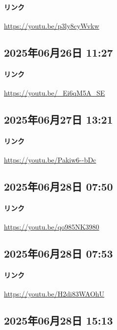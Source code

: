 \paragraph{リンク}
\url{https://youtu.be/p3ly8cyWvkw}

\subsection*{2025年06月26日 11:27}

\paragraph{リンク}
\url{https://youtu.be/_Ei6qM5A_SE}

\subsection*{2025年06月27日 13:21}

\paragraph{リンク}
\url{https://youtu.be/Pakiw6--bDc}

\subsection*{2025年06月28日 07:50}

\paragraph{リンク}
\url{https://youtu.be/qo985NK3980}

\subsection*{2025年06月28日 07:53}

\paragraph{リンク}
\url{https://youtu.be/H2di83WAOhU}

\subsection*{2025年06月28日 15:13}


